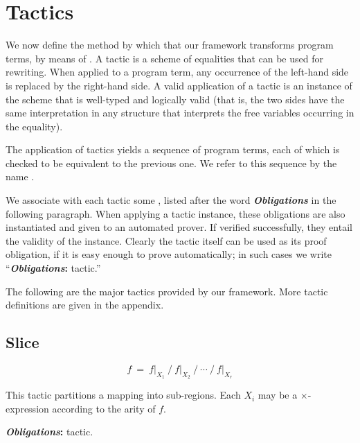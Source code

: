 \section{Tactics}

We now define the method by which that our framework transforms program terms, by means of .
A tactic is a scheme of equalities that can be used for rewriting.
When applied to a program term, any occurrence of the left-hand side is replaced by the right-hand side.
A valid application of a tactic is an instance of the scheme that is well-typed and logically valid
(that is, the two sides have the same interpretation in any structure that interprets the free
variables occurring in the equality).

The application of tactics yields a sequence of program terms, each of which is checked to
be equivalent to the previous one. We refer to this sequence by the name .

We associate with each tactic some , listed after the word \textbf{\textit{Obligations}}
in the following paragraph.
When applying a tactic instance, these obligations are also instantiated and given to an automated prover. 
If verified successfully, they entail the validity of the instance. 
Clearly the tactic itself can be used as its proof obligation, if it is easy enough to prove automatically; 
in such cases we write ``\textbf{\textit{Obligations}:} tactic.''

The following are the major tactics provided by our framework. 
More tactic definitions are given in the appendix.

\newcommand\Obligations{\medskip\noindent\textbf{\textit{Obligations}:} }
\newcommand\reduce{\operatorname{reduce}}
\newcommand\listConcat{{\scriptstyle \,++\,}}

\theoremstyle{definition}
\newtheorem{tactic}{Tactic}

\newcommand\tacticdef[1]{\subsection*{#1}}

\tacticdef{Slice} \label{tactics:Slice}
\[f ~=~ f\big|_{X_1} ~\Big/~ f\big|_{X_2} ~\Big/ ~\cdots~ \Big/~ f\big|_{X_r}\] 

This tactic partitions a mapping into sub-regions. Each $X_i$ may be a $\times$-expression
according to the arity of $f$.

\Obligations tactic.

